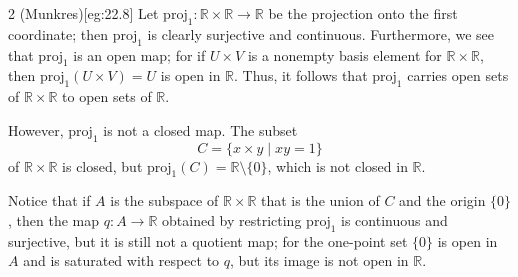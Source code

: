 \begin{egBox}{2 (Munkres)}[eg:22.8]
    Let \( \mathrm{proj}_{ 1 } : \mathbb{R} \times \mathbb{R} \rightarrow 
    \mathbb{R} \) be the projection onto the first coordinate; then 
    \( \mathrm{proj}_{ 1 } \) is clearly surjective and continuous.
    Furthermore, we see that \( \mathrm{proj}_{ 1 } \) is an open map; for if
    \( U \times V \) is a nonempty basis element for 
    \( \mathbb{R} \times \mathbb{R} \), then 
    \( \mathrm{proj}_{ 1 } ( U \times V ) = U \) is open in \( \mathbb{R} \).
    Thus, it follows that \( \mathrm{proj}_{ 1 } \) carries open sets of 
    \( \mathbb{R} \times \mathbb{R} \) to open sets of \( \mathbb{R} \).
    
    \baseSkip

    However, \( \mathrm{proj}_{ 1 } \) is not a closed map.
    The subset 
    \begin{equation*}
        C = \{ x \times y \mid x y = 1 \}
    \end{equation*}
    of \( \mathbb{R} \times \mathbb{R} \) is closed, but 
    \( \mathrm{proj}_{ 1 } ( C ) = \mathbb{R} \setminus \{ 0 \} \), which is
    not closed in \( \mathbb{R} \).

    \baseSkip

    Notice that if \( A \) is the subspace of \( \mathbb{R} \times \mathbb{R} \)
    that is the union of \( C \) and the origin \( \{ 0 \} \), then the map
    \( q: A \rightarrow \mathbb{R} \) obtained by restricting 
    \( \mathrm{proj}_{ 1 } \) is continuous and surjective, but it is still not
    a quotient map; for the one-point set \( \{ 0 \} \) is open in \( A \) and
    is saturated with respect to \( q \), but its image is not open in
    \( \mathbb{R} \).
\end{egBox}

